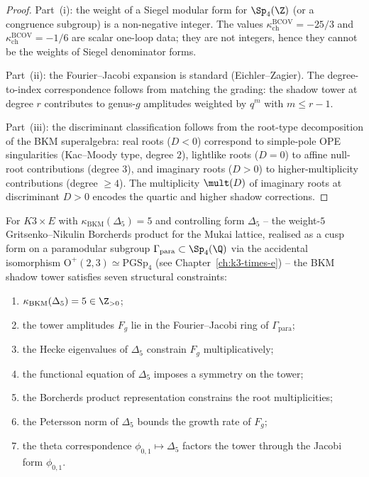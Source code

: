 \begin{proof}
Part~(i): the weight of a Siegel modular form for $\Sp_4(\Z)$ (or a congruence subgroup) is a non-negative integer. The values $\kappa_{\mathrm{ch}}^{\mathrm{BCOV}} = -25/3$ and $\kappa_{\mathrm{ch}}^{\mathrm{BCOV}} = -1/6$ are scalar one-loop data; they are not integers, hence they cannot be the weights of Siegel denominator forms.

Part~(ii): the Fourier--Jacobi expansion is standard (Eichler--Zagier). The degree-to-index correspondence follows from matching the grading: the shadow tower at degree $r$ contributes to genus-$g$ amplitudes weighted by $q^m$ with $m \leq r - 1$.

Part~(iii): the discriminant classification follows from the root-type decomposition of the BKM superalgebra: real roots ($D < 0$) correspond to simple-pole OPE singularities (Kac--Moody type, degree $2$), lightlike roots ($D = 0$) to affine null-root contributions (degree $3$), and imaginary roots ($D > 0$) to higher-multiplicity contributions (degree $\geq 4$). The multiplicity $\mult(D)$ of imaginary roots at discriminant $D > 0$ encodes the quartic and higher shadow corrections.
\end{proof}

\begin{corollary}
\label{cor:k3e-structural-constraints}
For $K3 \times E$ with $\kappa_{\mathrm{BKM}}(\Delta_5) = 5$ and controlling form $\Delta_5$ -- the weight-$5$ Gritsenko--Nikulin Borcherds product for the Mukai lattice, realised as a cusp form on a paramodular subgroup $\Gamma_{\mathrm{para}} \subset \Sp_4(\Q)$ via the accidental isomorphism $\mathrm{O}^+(2,3) \simeq \mathrm{PGSp}_4$ (see Chapter~\ref{ch:k3-times-e}) -- the BKM shadow tower satisfies seven structural constraints:
\begin{enumerate}[label=(\arabic*)]
 \item $\kappa_{\mathrm{BKM}}(\Delta_5) = 5 \in \Z_{>0}$;
 \item the tower amplitudes $F_g$ lie in the Fourier--Jacobi ring of $\Gamma_{\mathrm{para}}$;
 \item the Hecke eigenvalues of $\Delta_5$ constrain $F_g$ multiplicatively;
 \item the functional equation of $\Delta_5$ imposes a symmetry on the tower;
 \item the Borcherds product representation constrains the root multiplicities;
 \item the Petersson norm of $\Delta_5$ bounds the growth rate of $F_g$;
 \item the theta correspondence $\phi_{0,1} \mapsto \Delta_5$ factors the tower through the Jacobi form $\phi_{0,1}$.
\end{enumerate}
\end{corollary}


